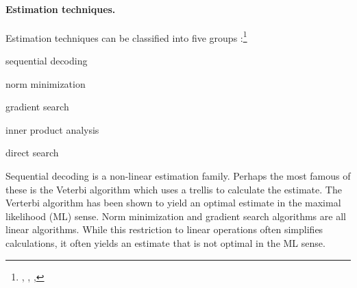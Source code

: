 \paragraph{Estimation techniques.}
\label{ref:sec:parameter-est}
Estimation techniques can be classified into 
five groups :\footnote{%
  ,
  ,
  ,
  }
\begin{enume}
   \item sequential decoding
   \item norm minimization
   \item gradient search
   \item inner product analysis
   \item direct search
\end{enume}

Sequential decoding is a non-linear estimation family.
Perhaps the most famous of these is the Veterbi algorithm which
uses a trellis to calculate the estimate.
The Verterbi algorithm has been shown to yield an optimal estimate
in the maximal likelihood (ML) sense.
Norm minimization and gradient search algorithms are all linear algorithms.
While this restriction to linear operations often simplifies calculations,
it often yields an estimate that is not optimal in the ML sense.

